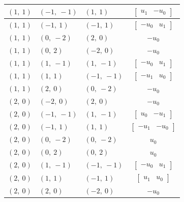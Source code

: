 \documentclass[11pt]{article}
\theoremstyle{definition}
\begin{document}
\begin{longtable}{|l|l|l|c|}
    \hline
    $\left( 1, \  1\right)$ & $\left( -1, \  -1\right)$ & $\left( 1, \  1\right)$ & $\left[\begin{matrix}u_{1} & - u_{0}\end{matrix}\right]$ \\
    \hline
    $\left( 1, \  1\right)$ & $\left( -1, \  1\right)$ & $\left( -1, \  1\right)$ & $\left[\begin{matrix}- u_{0} & u_{1}\end{matrix}\right]$ \\
    \hline
    $\left( 1, \  1\right)$ & $\left( 0, \  -2\right)$ & $\left( 2, \  0\right)$ & $- u_{0}$ \\
    \hline
    $\left( 1, \  1\right)$ & $\left( 0, \  2\right)$ & $\left( -2, \  0\right)$ & $- u_{0}$ \\
    \hline
    $\left( 1, \  1\right)$ & $\left( 1, \  -1\right)$ & $\left( 1, \  -1\right)$ & $\left[\begin{matrix}- u_{0} & u_{1}\end{matrix}\right]$ \\
    \hline
    $\left( 1, \  1\right)$ & $\left( 1, \  1\right)$ & $\left( -1, \  -1\right)$ & $\left[\begin{matrix}- u_{1} & u_{0}\end{matrix}\right]$ \\
    \hline
    $\left( 1, \  1\right)$ & $\left( 2, \  0\right)$ & $\left( 0, \  -2\right)$ & $- u_{0}$ \\
    \hline
    $\left( 2, \  0\right)$ & $\left( -2, \  0\right)$ & $\left( 2, \  0\right)$ & $- u_{0}$ \\
    \hline
    $\left( 2, \  0\right)$ & $\left( -1, \  -1\right)$ & $\left( 1, \  -1\right)$ & $\left[\begin{matrix}u_{0} & - u_{1}\end{matrix}\right]$ \\
    \hline
    $\left( 2, \  0\right)$ & $\left( -1, \  1\right)$ & $\left( 1, \  1\right)$ & $\left[\begin{matrix}- u_{1} & - u_{0}\end{matrix}\right]$ \\
    \hline
    $\left( 2, \  0\right)$ & $\left( 0, \  -2\right)$ & $\left( 0, \  -2\right)$ & $u_{0}$ \\
    \hline
    $\left( 2, \  0\right)$ & $\left( 0, \  2\right)$ & $\left( 0, \  2\right)$ & $u_{0}$ \\
    \hline
    $\left( 2, \  0\right)$ & $\left( 1, \  -1\right)$ & $\left( -1, \  -1\right)$ & $\left[\begin{matrix}- u_{0} & u_{1}\end{matrix}\right]$ \\
    \hline
    $\left( 2, \  0\right)$ & $\left( 1, \  1\right)$ & $\left( -1, \  1\right)$ & $\left[\begin{matrix}u_{1} & u_{0}\end{matrix}\right]$ \\
    \hline
    $\left( 2, \  0\right)$ & $\left( 2, \  0\right)$ & $\left( -2, \  0\right)$ & $- u_{0}$ \\
    \hline
\end{longtable}
\end{document}
